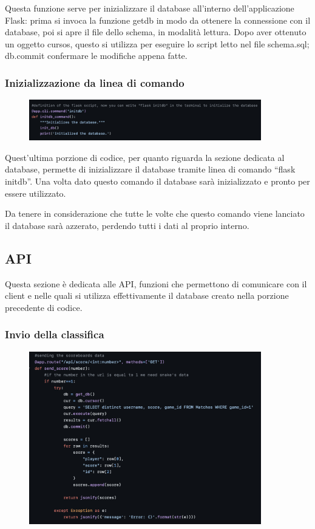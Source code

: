 \documentclass{article}
\begin{document}
Questa funzione serve per inizializzare il database all’interno dell’applicazione Flask: prima si invoca la funzione get\textunderscore db in modo da ottenere la connessione con il database, poi si apre il file dello schema, in modalità lettura.
Dopo aver ottenuto un oggetto cursos, questo si utilizza per eseguire lo script letto nel file schema.sql; db.commit confermare le modifiche appena fatte.



\subsubsection{Inizializzazione da linea di comando}
\begin{figure}[H]
    \centering
    \includegraphics[width=0.9\textwidth]{images/inizializzazione_linea_comando.png}
\end{figure}

Quest’ultima porzione di codice, per quanto riguarda la sezione dedicata al database, permette di inizializzare il database tramite linea di comando “flask initdb”. 
Una volta dato questo comando il database sarà inizializzato e pronto per essere utilizzato.

Da tenere in considerazione che tutte le volte che questo comando viene lanciato il database sarà azzerato, perdendo tutti i dati al proprio interno.


\subsection{API}
Questa sezione è dedicata alle API, funzioni che permettono di comunicare con il client e nelle quali si utilizza effettivamente il database creato nella porzione precedente di codice.

\subsubsection{Invio della classifica}
\begin{figure}[H]
    \centering
    \includegraphics[width=0.9\textwidth]{images/invio_classifica1.png}
\end{figure}
\end{document}
